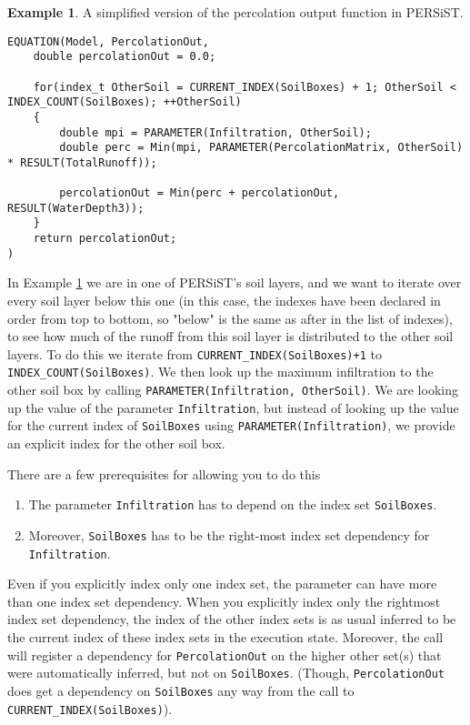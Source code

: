 \documentclass[11pt]{article}
\theoremstyle{definition}
\newtheorem{myexample}{Example}
\newenvironment{example}%
  {\begin{lrbox}{\examplebox}%
   \begin{minipage}{\dimexpr\linewidth-2\fboxsep}
   \begin{myexample}}%
  {\end{myexample}%
   \end{minipage}%
   \end{lrbox}%
   \begin{trivlist}
     \item[]\colorbox{silver}{\usebox\examplebox}
   \end{trivlist}}
\begin{document}
\begin{example}\label{ex:persistpercout}
A simplified version of the percolation output function in PERSiST.
\begin{lstlisting}[style=mycpp]
EQUATION(Model, PercolationOut,
	double percolationOut = 0.0;
	
	for(index_t OtherSoil = CURRENT_INDEX(SoilBoxes) + 1; OtherSoil < INDEX_COUNT(SoilBoxes); ++OtherSoil)
	{
		double mpi = PARAMETER(Infiltration, OtherSoil);
		double perc = Min(mpi, PARAMETER(PercolationMatrix, OtherSoil) * RESULT(TotalRunoff));
		
		percolationOut = Min(perc + percolationOut, RESULT(WaterDepth3));
	}
	return percolationOut;
)
\end{lstlisting}
\end{example}

In Example \ref{ex:persistpercout} we are in one of PERSiST's soil layers, and we want to iterate over every soil layer below this one (in this case, the indexes have been declared in order from top to bottom, so "below" is the same as after in the list of indexes), to see how much of the runoff from this soil layer is distributed to the other soil layers. To do this we iterate from {\tt CURRENT\_INDEX(SoilBoxes)+1} to {\tt INDEX\_COUNT(SoilBoxes)}. We then look up the maximum infiltration to the other soil box by calling {\tt PARAMETER(Infiltration, OtherSoil)}. We are looking up the value of the parameter {\tt Infiltration}, but instead of looking up the value for the current index of {\tt SoilBoxes} using {\tt PARAMETER(Infiltration)}, we provide an explicit index for the other soil box.

There are a few prerequisites for allowing you to do this
\begin{enumerate}[i]
\item The parameter {\tt Infiltration} has to depend on the index set {\tt SoilBoxes}.
\item Moreover, {\tt SoilBoxes} has to be the right-most index set dependency for {\tt Infiltration}.
\end{enumerate}
Even if you explicitly index only one index set, the parameter can have more than one index set dependency. When you explicitly index only the rightmost index set dependency, the index of the other index sets is as usual inferred to be the current index of these index sets in the execution state. Moreover, the call will register a dependency for {\tt PercolationOut} on the higher other set(s) that were automatically inferred, but not on {\tt SoilBoxes}. (Though, {\tt PercolationOut} does get a dependency on  {\tt SoilBoxes} any way from the call to {\tt CURRENT\_INDEX(SoilBoxes)}).
\end{document}
